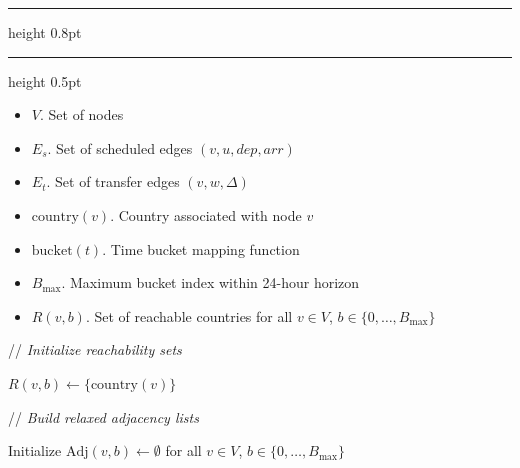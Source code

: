 \documentclass{article}
\newcommand{\CommentLine}[1]{
    \State // \textit{#1}
}
\begin{document}
\pagestyle{empty}
\allowdisplaybreaks[1] 
\setcounter{page}{1}


\setcounter{algorithm}{2}
\begin{center}
    \hrule height 0.8pt
    \vspace{0.3em}
    \label{alg:relaxed_reachability_backpropagation}
    \vspace{0.2em}
    \hrule height 0.5pt
\end{center}

\begin{algorithmic}[1] %
    
    \Input
    \begin{itemize}
        \item $V$. Set of nodes
        \item $E_s$. Set of scheduled edges $(v,u,dep,arr)$
        \item $E_t$. Set of transfer edges $(v,w,\Delta)$
        \item $\text{country}(v)$. Country associated with node $v$
        \item $\text{bucket}(t)$. Time bucket mapping function
        \item $B_{\text{max}}$. Maximum bucket index within 24-hour horizon
    \end{itemize}

    \Output
    \begin{itemize}
        \item $R(v,b)$. Set of reachable countries for all $v \in V$, $b \in \{0,\ldots,B_{\text{max}}\}$
    \end{itemize}
    \vspace{0.5em} 

    \CommentLine{Initialize reachability sets}
            \State $R(v,b) \leftarrow \{\text{country}(v)\}$
        \EndFor
    \EndFor

    \vspace{0.5em}
    \CommentLine{Build relaxed adjacency lists}
    \State Initialize $\text{Adj}(v,b) \leftarrow \emptyset$ for all $v \in V$, $b \in \{0,\ldots,B_{\text{max}}\}$


\end{algorithmic}
\end{document}
